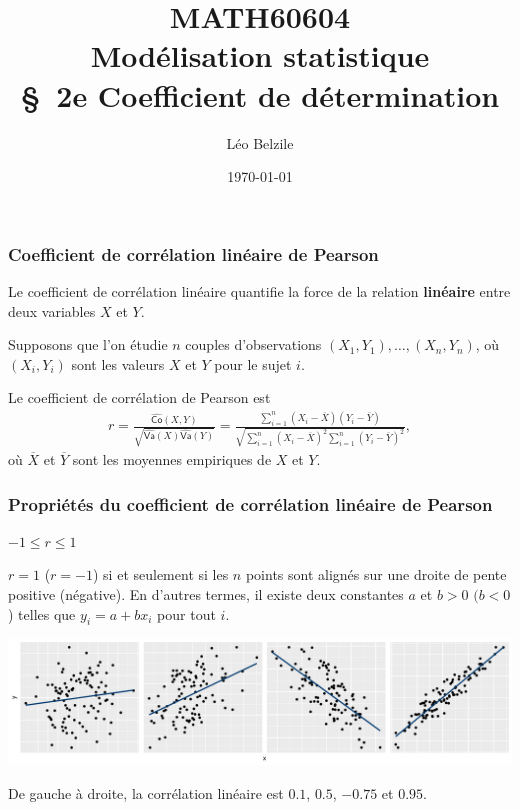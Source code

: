 \documentclass[xcolor={dvipsnames}]{beamer}
\title[\color{white}{MATH60604 \S~2e Coefficient de détermination}]{MATH60604 \\Modélisation statistique \\ \S~2e Coefficient de détermination}
\author{Léo Belzile}
\date{\today}
\institute{HEC Montréal\\
Département de sciences de la décision}
\date{}
\begin{document}
\frame{\titlepage}


\begin{frame}
\frametitle{Coefficient de corrélation linéaire de Pearson}
\bi
\item Le coefficient de corrélation linéaire \alert{quantifie} la force de la relation \textbf{linéaire} entre deux variables $X$ et $Y$. 
\item Supposons que l’on étudie $n$ couples d’observations $(X_1, Y_1),\ldots,(X_n, Y_n)$, où $(X_i, Y_i)$ sont les valeurs $X$ et $Y$ pour le sujet $i$.
\item Le coefficient de corrélation de Pearson est
\begin{align*}
r=\frac{\widehat{\mathsf{Co}}(X,Y)}{\sqrt{\widehat{\mathsf{Va}}(X)\widehat{\mathsf{Va}}(Y)}} =\frac{\sum_{i=1}^n (X_i-\overline{X})(Y_i-\overline{Y})}{\sqrt{\sum_{i=1}^n(X_i-\overline{X})^2 \sum_{i=1}^n (Y_i-\overline{Y})^2}},\end{align*}
où $\overline{X}$ et $\overline{Y}$ sont les moyennes empiriques de $X$ et $Y$.
\ei
\end{frame}

\begin{frame}
\frametitle{Propriétés du coefficient de corrélation linéaire de Pearson}
\begin{tcolorbox}[colback=lightgray!30!white, colframe=lightgray!75!black, title=Propriétés du coefficient de corrélation linéaire de Pearson]
\bi
\item $-1 \leq r \leq 1$
\item $r=1$ ($r=-1$)  si et seulement si les $n$ points sont alignés sur une droite de pente positive (négative). En d'autres termes, il existe deux constantes $a$ et $b > 0$ $(b <0$) telles que $y_i=a+b x_i$ pour tout $i$.
\ei
\end{tcolorbox}
 \begin{center}
  \includegraphics[width = \textwidth]{img/c2/03-linreg-correlation}
 \end{center}
{\footnotesize 
De gauche à droite, la corrélation linéaire est $0.1$, $0.5$, $-0.75$ et $0.95$.


}
 
\end{frame}
\end{document}
